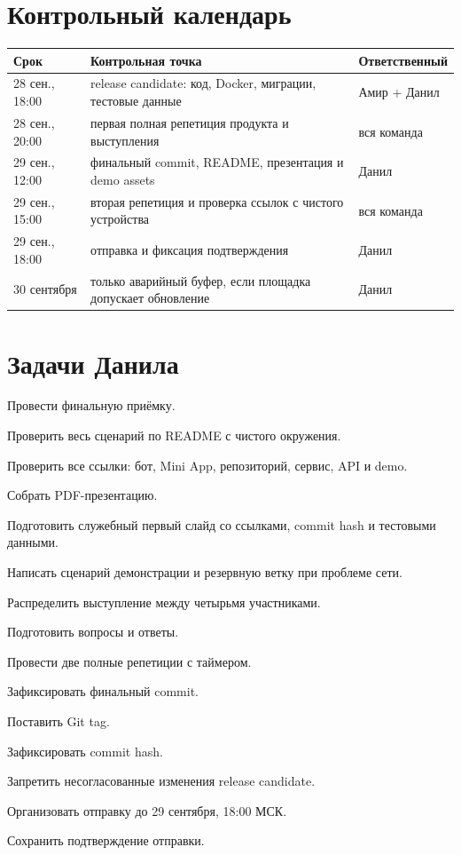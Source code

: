 \documentclass[11pt,a4paper]{article}
\begin{document}
\section{Контрольный календарь}
\begin{tabularx}{\textwidth}{p{39mm}X>{\raggedright\arraybackslash}p{38mm}}\toprule
Срок & Контрольная точка & Ответственный\\\midrule
28 сен., 18:00 & release candidate: код, Docker, миграции, тестовые данные & Амир + Данил\\
28 сен., 20:00 & первая полная репетиция продукта и выступления & вся команда\\
29 сен., 12:00 & финальный commit, README, презентация и demo assets & Данил\\
29 сен., 15:00 & вторая репетиция и проверка ссылок с чистого устройства & вся команда\\
29 сен., 18:00 & отправка и фиксация подтверждения & Данил\\
30 сентября & только аварийный буфер, если площадка допускает обновление & Данил\\\bottomrule
\end{tabularx}

\section{Задачи Данила}
\begin{tasklist}
  \item Провести финальную приёмку.
  \item Проверить весь сценарий по README с чистого окружения.
  \item Проверить все ссылки: бот, Mini App, репозиторий, сервис, API и demo.
  \item Собрать PDF-презентацию.
  \item Подготовить служебный первый слайд со ссылками, commit hash и тестовыми данными.
  \item Написать сценарий демонстрации и резервную ветку при проблеме сети.
  \item Распределить выступление между четырьмя участниками.
  \item Подготовить вопросы и ответы.
  \item Провести две полные репетиции с таймером.
  \item Зафиксировать финальный commit.
  \item Поставить Git tag.
  \item Зафиксировать commit hash.
  \item Запретить несогласованные изменения release candidate.
  \item Организовать отправку до 29 сентября, 18:00 МСК.
  \item Сохранить подтверждение отправки.
\end{tasklist}
\end{document}
